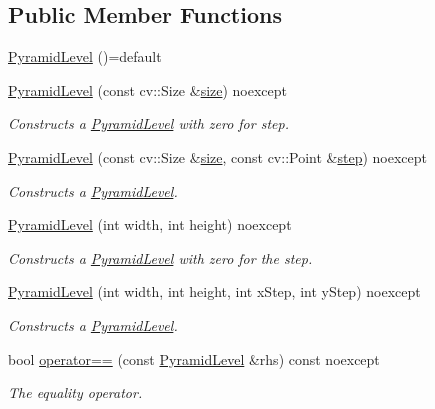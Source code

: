 \subsection*{Public Member Functions}
\begin{DoxyCompactItemize}
\item 
\hyperlink{structdg_1_1deepcore_1_1imagery_1_1_pyramid_level_a02d5500ac1f4fb61166b089b21fbe224}{Pyramid\+Level} ()=default
\item 
\hyperlink{group___imagery_module_ga64dc65f27bed7bb4888bc0375eb9d99a}{Pyramid\+Level} (const cv\+::\+Size \&\hyperlink{structdg_1_1deepcore_1_1imagery_1_1_pyramid_level_a75e0034ad50a997202c7e31f3bdc0aed}{size}) noexcept
\begin{DoxyCompactList}\small\item\em Constructs a \hyperlink{structdg_1_1deepcore_1_1imagery_1_1_pyramid_level}{Pyramid\+Level} with zero for step. \end{DoxyCompactList}\item 
\hyperlink{group___imagery_module_gab23e577c28dd7a700976dc26cef3db76}{Pyramid\+Level} (const cv\+::\+Size \&\hyperlink{structdg_1_1deepcore_1_1imagery_1_1_pyramid_level_a75e0034ad50a997202c7e31f3bdc0aed}{size}, const cv\+::\+Point \&\hyperlink{structdg_1_1deepcore_1_1imagery_1_1_pyramid_level_a713f44d063951b9ca53cc7d76f65f718}{step}) noexcept
\begin{DoxyCompactList}\small\item\em Constructs a \hyperlink{structdg_1_1deepcore_1_1imagery_1_1_pyramid_level}{Pyramid\+Level}. \end{DoxyCompactList}\item 
\hyperlink{group___imagery_module_ga9675c2d85800ca99ea908f26996dbcc1}{Pyramid\+Level} (int width, int height) noexcept
\begin{DoxyCompactList}\small\item\em Constructs a \hyperlink{structdg_1_1deepcore_1_1imagery_1_1_pyramid_level}{Pyramid\+Level} with zero for the step. \end{DoxyCompactList}\item 
\hyperlink{group___imagery_module_ga6e5a71cc3c52efc7890ebb8d2151b35d}{Pyramid\+Level} (int width, int height, int x\+Step, int y\+Step) noexcept
\begin{DoxyCompactList}\small\item\em Constructs a \hyperlink{structdg_1_1deepcore_1_1imagery_1_1_pyramid_level}{Pyramid\+Level}. \end{DoxyCompactList}\item 
bool \hyperlink{group___imagery_module_ga4195fc5c6eb71435e4aa06165bbb6f36}{operator==} (const \hyperlink{structdg_1_1deepcore_1_1imagery_1_1_pyramid_level}{Pyramid\+Level} \&rhs) const noexcept
\begin{DoxyCompactList}\small\item\em The equality operator. \end{DoxyCompactList}\end{DoxyCompactItemize}
